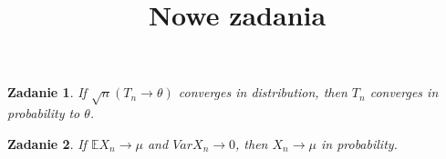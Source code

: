 \documentclass{mwart}
\title{Nowe zadania}
\newtheorem{zd}{Zadanie}
\begin{document}

\maketitle
\begin{zd}
If $\sqrt{n}\left(T_n \to \theta \right)$ converges in distribution, then $T_n$ converges in probability to $\theta$.
\end{zd}

\begin{zd}
If $\mathbb{E}X_n \to \mu$ and $VarX_n \to 0$, then $X_n \to \mu$ in probability.
\end{zd}
\end{document}
